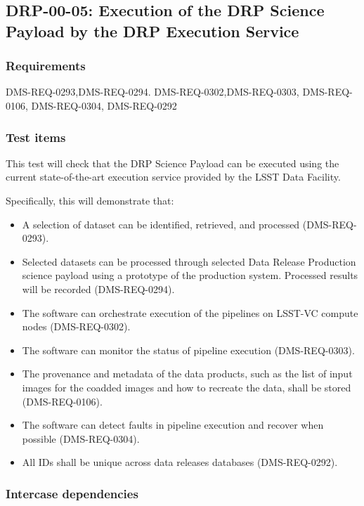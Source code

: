 \subsection{DRP-00-05: Execution of the DRP Science Payload by the DRP Execution Service}
\label{drp-00-05}

\subsubsection{Requirements}

%
DMS-REQ-0293,DMS-REQ-0294.
DMS-REQ-0302,DMS-REQ-0303,
DMS-REQ-0106,
DMS-REQ-0304,
DMS-REQ-0292

\subsubsection{Test items}

This test will check that the DRP Science Payload can be executed using the current state-of-the-art execution service provided by the LSST Data Facility.

Specifically, this will demonstrate that:

\begin{itemize}

  \item{A selection of dataset can be identified, retrieved, and processed (DMS-REQ-0293).}
  \item{Selected datasets can be processed through selected Data Release Production science payload using a prototype of the production system. Processed results will be recorded (DMS-REQ-0294).}
  \item{The software can orchestrate execution of the pipelines on LSST-VC compute nodes (DMS-REQ-0302).}
  \item{The software can monitor the status of pipeline execution (DMS-REQ-0303).}

  \item{The provenance and metadata of the data products, such as the list of input images for the coadded images and how to recreate the data, shall be stored (DMS-REQ-0106).}
  \item{The software can detect faults in pipeline execution and recover when possible (DMS-REQ-0304).}
  \item{All IDs shall be unique across data releases databases (DMS-REQ-0292).}

\end{itemize}

\subsubsection{Intercase dependencies}

